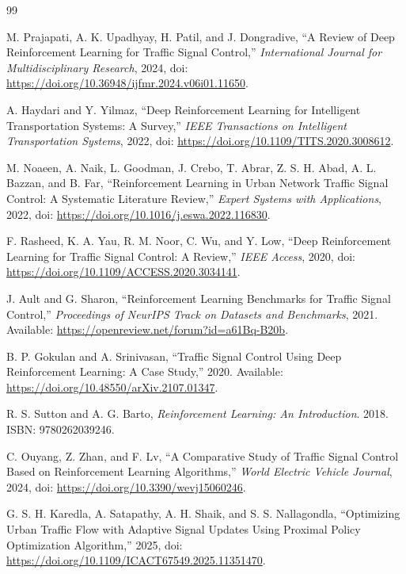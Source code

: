 \begin{thebibliography}{99}

M. Prajapati, A. K. Upadhyay, H. Patil, and J. Dongradive, ``A Review of Deep Reinforcement Learning for Traffic Signal Control,'' \textit{International Journal for Multidisciplinary Research}, 2024, doi: \url{https://doi.org/10.36948/ijfmr.2024.v06i01.11650}.

A. Haydari and Y. Yilmaz, ``Deep Reinforcement Learning for Intelligent Transportation Systems: A Survey,'' \textit{IEEE Transactions on Intelligent Transportation Systems}, 2022, doi: \url{https://doi.org/10.1109/TITS.2020.3008612}.

M. Noaeen, A. Naik, L. Goodman, J. Crebo, T. Abrar, Z. S. H. Abad, A. L. Bazzan, and B. Far, ``Reinforcement Learning in Urban Network Traffic Signal Control: A Systematic Literature Review,'' \textit{Expert Systems with Applications}, 2022, doi: \url{https://doi.org/10.1016/j.eswa.2022.116830}.

F. Rasheed, K. A. Yau, R. M. Noor, C. Wu, and Y. Low, ``Deep Reinforcement Learning for Traffic Signal Control: A Review,'' \textit{IEEE Access}, 2020, doi: \url{https://doi.org/10.1109/ACCESS.2020.3034141}.

J. Ault and G. Sharon, ``Reinforcement Learning Benchmarks for Traffic Signal Control,'' \textit{Proceedings of NeurIPS Track on Datasets and Benchmarks}, 2021. Available: \url{https://openreview.net/forum?id=a61Bq-B20b}.

B. P. Gokulan and A. Srinivasan, ``Traffic Signal Control Using Deep Reinforcement Learning: A Case Study,'' 2020. Available: \url{https://doi.org/10.48550/arXiv.2107.01347}.

R. S. Sutton and A. G. Barto, \textit{Reinforcement Learning: An Introduction}. 2018. ISBN: 9780262039246.

C. Ouyang, Z. Zhan, and F. Lv, ``A Comparative Study of Traffic Signal Control Based on Reinforcement Learning Algorithms,'' \textit{World Electric Vehicle Journal}, 2024, doi: \url{https://doi.org/10.3390/wevj15060246}.

G. S. H. Karedla, A. Satapathy, A. H. Shaik, and S. S. Nallagondla, ``Optimizing Urban Traffic Flow with Adaptive Signal Updates Using Proximal Policy Optimization Algorithm,'' 2025, doi: \url{https://doi.org/10.1109/ICACT67549.2025.11351470}.


\end{thebibliography}
